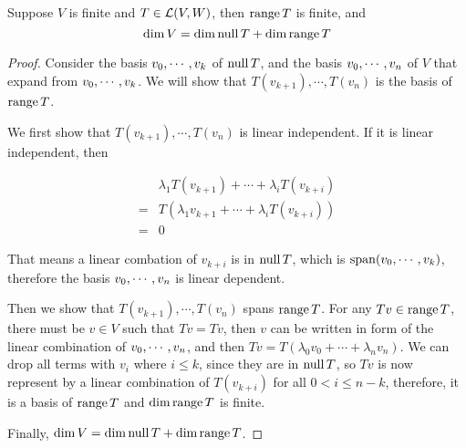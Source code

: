 \documentclass[../main.tex]{subfiles}
\begin{document}
\setcounter{theorem}{20}
\begin{theorem}
  Suppose $V$ is finite and $T \in \mathcal{L}(V, W)$, then $\operatorname{range} T$ is finite, and
  \[
  \dim V = \dim \operatorname{null} T + \dim \operatorname{range} T
  \]
\end{theorem}
\begin{proof}
  Consider the basis $v_0 , \cdots , v_{k}$ of $\operatorname{null} T$, and the basis $v_0 , \cdots , v_{n}$ of $V$ that expand from $v_0 , \cdots , v_{k}$.
  We will show that $T(v_{k + 1}) , \cdots , T(v_n)$ is the basis of $\operatorname{range} T$.

  We first show that $T(v_{k + 1}) , \cdots , T(v_n)$ is linear independent. If it is linear independent,
  then

  \begin{align*}
     & \lambda_1 T(v_{k + 1}) + \cdots + \lambda_i T(v_{k + i}) \\
    =& T(\lambda_1 v_{k + 1} + \cdots + \lambda_i T(v_{k + i})) \\
    =& 0
  \end{align*}

  That means a linear combation of $v_{k + i}$ is in $\operatorname{null} T$, which is $\operatorname{span}(v_0 , \cdots , v_{k})$,
  therefore the basis $v_0 , \cdots , v_{n}$ is linear dependent.

  Then we show that $T(v_{k + 1}) , \cdots , T(v_n)$ spans $\operatorname{range} T$. For any $Tv \in \operatorname{range} T$,
  there must be $v \in V$ such that $Tv = Tv$, then $v$ can be written in form of the linear combination
  of $v_0 , \cdots , v_{n}$, and then $Tv = T(\lambda_0v_0 + \cdots + \lambda_nv_n)$.
  We can drop all terms with $v_i$ where $i \le k$, since they are in $\operatorname{null} T$,
  so $Tv$ is now represent by a linear combination of $T(v_{k + i})$ for all $0 < i \le n - k$,
  therefore, it is a basis of $\operatorname{range} T$ and $\dim \operatorname{range} T$ is finite.

  Finally, $\dim V = \dim \operatorname{null} T + \dim \operatorname{range} T$.
\end{proof}
\end{document}
